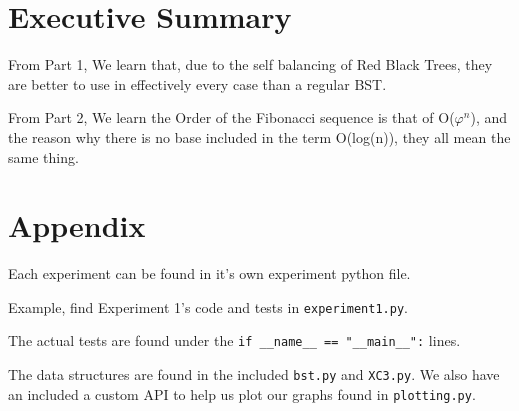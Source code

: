 \documentclass{article}
\begin{document}
\section{Executive Summary}

From Part 1, We learn that, due to the self balancing of Red Black Trees, they are better to use in effectively every case than a regular BST.

From Part 2, We learn the Order of the Fibonacci sequence is that of O($\varphi^{n}$), and the reason why there is no base included in the term O(log(n)), they all mean the same thing. 


\newpage
\section{Appendix}

Each experiment can be found in it's own experiment python file. 

Example, find Experiment 1's code and tests in \verb|experiment1.py|.

The actual tests are found under the \verb|if __name__ == "__main__":| lines.

The data structures are found in the included \verb|bst.py| and \verb|XC3.py|. We also have an included a custom API to help us plot our graphs found in \verb|plotting.py|.
\end{document}

